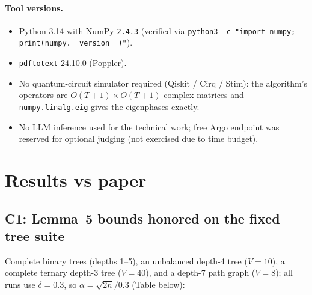\documentclass[11pt]{article}
\begin{document}
\paragraph{Tool versions.}
\begin{itemize}
\item Python 3.14 with NumPy \texttt{2.4.3} (verified via \verb|python3 -c "import numpy; print(numpy.__version__)"|).
\item \texttt{pdftotext} 24.10.0 (Poppler).
\item No quantum-circuit simulator required (Qiskit / Cirq / Stim): the
      algorithm's operators are $O(T{+}1) \times O(T{+}1)$ complex matrices and
      \verb|numpy.linalg.eig| gives the eigenphases exactly.
\item No LLM inference used for the technical work; free Argo endpoint was
      reserved for optional judging (not exercised due to time budget).
\end{itemize}

\section{Results vs paper}

\subsection*{C1: Lemma~5 bounds honored on the fixed tree suite}
Complete binary trees (depths 1--5), an unbalanced depth-4 tree
($V{=}10$), a complete ternary depth-3 tree ($V{=}40$), and a depth-7 path
graph ($V{=}8$); all runs use $\delta = 0.3$, so
$\alpha = \sqrt{2n}/0.3$ (Table below):
\end{document}
